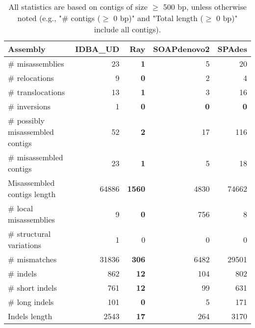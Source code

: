 \documentclass[12pt,a4paper]{article}
\begin{document}
\begin{table}[ht]
\begin{center}
\caption{All statistics are based on contigs of size $\geq$ 500 bp, unless otherwise noted (e.g., "\# contigs ($\geq$ 0 bp)" and "Total length ($\geq$ 0 bp)" include all contigs).}
\begin{tabular}{|l*{4}{|r}|}
\hline
Assembly & IDBA\_UD & Ray & SOAPdenovo2 & SPAdes \\ \hline
\# misassemblies & 23 & {\bf 1} & 5 & 20 \\ \hline
\hspace{5mm}\# relocations & 9 & {\bf 0} & 2 & 4 \\ \hline
\hspace{5mm}\# translocations & 13 & {\bf 1} & 3 & 16 \\ \hline
\hspace{5mm}\# inversions & 1 & {\bf 0} & {\bf 0} & {\bf 0} \\ \hline
\# possibly misassembled contigs & 52 & {\bf 2} & 17 & 116 \\ \hline
\# misassembled contigs & 23 & {\bf 1} & 5 & 18 \\ \hline
Misassembled contigs length & 64886 & {\bf 1560} & 4830 & 74662 \\ \hline
\# local misassemblies & 9 & {\bf 0} & 756 & 8 \\ \hline
\# structural variations & 1 & 0 & 0 & 0 \\ \hline
\# mismatches & 31836 & {\bf 306} & 6482 & 29501 \\ \hline
\# indels & 862 & {\bf 12} & 104 & 802 \\ \hline
\hspace{5mm}\# short indels & 761 & {\bf 12} & 99 & 631 \\ \hline
\hspace{5mm}\# long indels & 101 & {\bf 0} & 5 & 171 \\ \hline
Indels length & 2543 & {\bf 17} & 264 & 3170 \\ \hline
\end{tabular}
\end{center}
\end{table}
\end{document}
